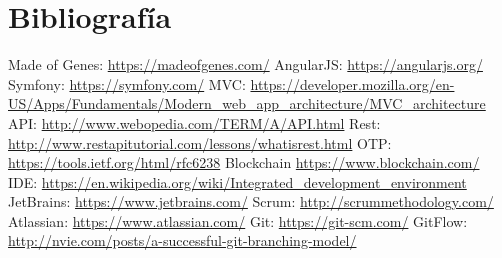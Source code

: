 \section{Bibliografía}

\renewcommand\refname{}
\begin{thebibliography}{1}

 Made of Genes: \url{https://madeofgenes.com/}
 AngularJS: \url{https://angularjs.org/}
 Symfony: \url{https://symfony.com/}
 MVC: \url{https://developer.mozilla.org/en-US/Apps/Fundamentals/Modern_web_app_architecture/MVC_architecture}
 API: \url{http://www.webopedia.com/TERM/A/API.html}
 Rest: \url{http://www.restapitutorial.com/lessons/whatisrest.html}
 OTP: \url{https://tools.ietf.org/html/rfc6238}
 Blockchain \url{https://www.blockchain.com/}
 IDE: \url{https://en.wikipedia.org/wiki/Integrated_development_environment}
 JetBrains: \url{https://www.jetbrains.com/}
 Scrum: \url{http://scrummethodology.com/}
 Atlassian: \url{https://www.atlassian.com/}
 Git: \url{https://git-scm.com/}
 GitFlow: \url{http://nvie.com/posts/a-successful-git-branching-model/}

\vspace*{0.1in}
\end{thebibliography}